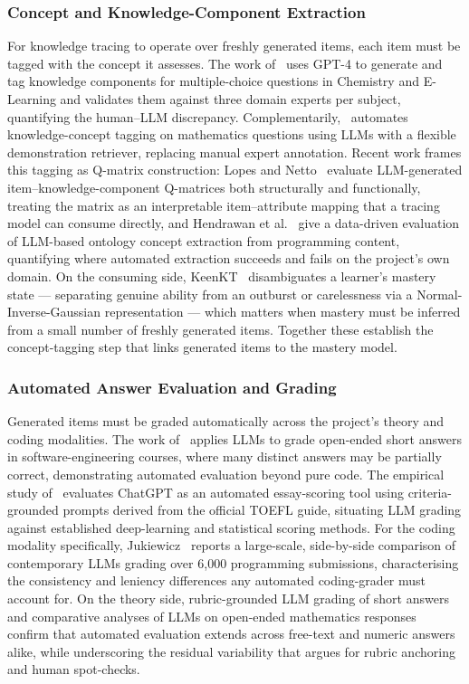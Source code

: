 \documentclass[12pt]{report}
\begin{document}
\subsubsection{Concept and Knowledge-Component Extraction}
For knowledge tracing to operate over freshly generated items, each item must be tagged
with the concept it assesses. The work of~\cite{kctag2024} uses GPT-4 to generate and tag
knowledge components for multiple-choice questions in Chemistry and E-Learning and
validates them against three domain experts per subject, quantifying the
human--LLM discrepancy. Complementarily,~\cite{concepttag2024} automates knowledge-concept
tagging on mathematics questions using LLMs with a flexible demonstration retriever,
replacing manual expert annotation. Recent work frames this tagging as Q-matrix
construction: Lopes and Netto~\cite{qmatrix2026} evaluate LLM-generated
item--knowledge-component Q-matrices both structurally and functionally, treating the
matrix as an interpretable item--attribute mapping that a tracing model can consume
directly, and Hendrawan et al.~\cite{hendrawan2026} give a data-driven evaluation of
LLM-based ontology concept extraction from programming content, quantifying where automated
extraction succeeds and fails on the project's own domain. On the consuming side,
KeenKT~\cite{keenkt2026} disambiguates a learner's mastery state --- separating genuine
ability from an outburst or carelessness via a Normal-Inverse-Gaussian representation ---
which matters when mastery must be inferred from a small number of freshly generated items.
Together these establish the concept-tagging step that links generated items to the mastery
model.

\subsubsection{Automated Answer Evaluation and Grading}
Generated items must be graded automatically across the project's theory and coding
modalities. The work of~\cite{llmgrade2024} applies LLMs to grade open-ended short answers
in software-engineering courses, where many distinct answers may be partially correct,
demonstrating automated evaluation beyond pure code. The empirical study
of~\cite{essay2024} evaluates ChatGPT as an automated essay-scoring tool using
criteria-grounded prompts derived from the official TOEFL guide, situating LLM grading
against established deep-learning and statistical scoring methods. For the coding modality
specifically, Jukiewicz~\cite{jukiewicz2026} reports a large-scale, side-by-side comparison
of contemporary LLMs grading over 6{,}000 programming submissions, characterising the
consistency and leniency differences any automated coding-grader must account for. On the
theory side, rubric-grounded LLM grading of short answers~\cite{senanayake2024} and
comparative analyses of LLMs on open-ended mathematics responses~\cite{baral2024} confirm
that automated evaluation extends across free-text and numeric answers alike, while
underscoring the residual variability that argues for rubric anchoring and human
spot-checks.
\end{document}
